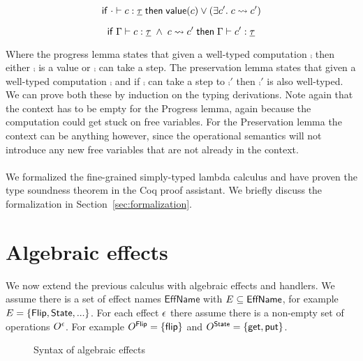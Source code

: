 {\begin{lemma}[Progress]
\[
	\mathsf{if}\;
		\cdot \vdash c : \underline{\tau}
	\;\mathsf{then}\;
		\mathsf{value}(c)
		\lor
		(\exists c'.\; c \rightsquigarrow c')
\]
\end{lemma}

\begin{lemma}[Preservation]
\[
	\mathsf{if}\;
		\Gamma \vdash c : \underline{\tau}
		\;\land\;
		c \rightsquigarrow c'
	\;\mathsf{then}\;
		\Gamma \vdash c' : \underline{\tau}
\]
\end{lemma}

Where the progress lemma states that given a well-typed computation $\comp$ then either $\comp$ is a value or $\comp$ can take a  step. The preservation lemma states that given a well-typed computation $\comp$ and if $\comp$ can take a step to $\comp'$ then $\comp'$ is also well-typed. We can prove both these by induction on the typing derivations. Note again that the context has to be empty for the Progress lemma, again because the computation could get stuck on free variables. For the Preservation lemma the context can be anything however, since the operational semantics will not introduce any new free variables that are not already in the context.
\\\\
We formalized the fine-grained simply-typed lambda calculus and have proven the type soundness theorem in the Coq proof assistant.
We briefly discuss the formalization in Section~\ref{sec:formalization}.

\newpage
\section{Algebraic effects} \label{section:algeff}

We now extend the previous calculus with algebraic effects and handlers.
We assume there is a set of effect names $\mathsf{EffName}$ with $E \subseteq \mathsf{EffName}$, for example $E = \{ \mathsf{Flip}, \mathsf{State}, ... \}$. For each effect $\epsilon$ there assume there is a non-empty set of operations $O^{\epsilon}$.
For example $O^{\mathsf{Flip}} = \{ \mathsf{flip} \}$ and $O^{\mathsf{State}} = \{ \mathsf{get}, \mathsf{put} \}$.

\begin{figure}
\caption{Syntax of algebraic effects}
\centering
{}
\end{figure}

}
